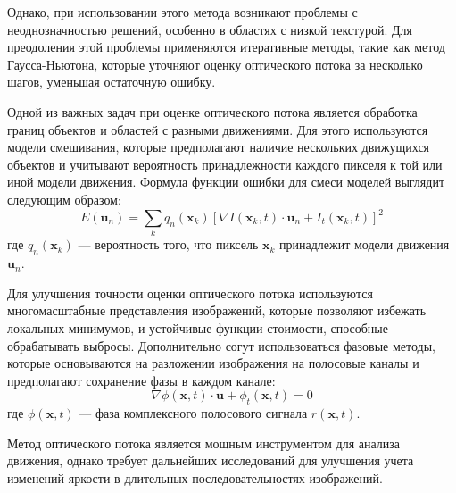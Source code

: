 Однако, при использовании этого метода возникают проблемы с неоднозначностью решений, особенно в областях с низкой текстурой. Для преодоления этой проблемы применяются итеративные методы, такие как метод Гаусса-Ньютона, которые уточняют оценку оптического потока за несколько шагов, уменьшая остаточную ошибку.

Одной из важных задач при оценке оптического потока является обработка границ объектов и областей с разными движениями. Для этого используются модели смешивания, которые предполагают наличие нескольких движущихся объектов и учитывают вероятность принадлежности каждого пикселя к той или иной модели движения. Формула функции ошибки для смеси моделей выглядит следующим образом:
\[ E(\mathbf{u}_n) = \sum_k q_n(\mathbf{x}_k) [\nabla I(\mathbf{x}_k, t) \cdot \mathbf{u}_n + I_t(\mathbf{x}_k, t)]^2 \]
где \( q_n(\mathbf{x}_k) \) — вероятность того, что пиксель \(\mathbf{x}_k\) принадлежит модели движения \(\mathbf{u}_n\).

Для улучшения точности оценки оптического потока используются многомасштабные представления изображений, которые позволяют избежать локальных минимумов, и устойчивые функции стоимости, способные обрабатывать выбросы. Дополнительно согут использоваться фазовые методы, которые основываются на разложении изображения на полосовые каналы и предполагают сохранение фазы в каждом канале:
\[ \nabla \phi(\mathbf{x}, t) \cdot \mathbf{u} + \phi_t(\mathbf{x}, t) = 0 \]
где \(\phi(\mathbf{x}, t)\) — фаза комплексного полосового сигнала \( r(\mathbf{x}, t) \).

Метод оптического потока является мощным инструментом для анализа движения, однако требует дальнейших исследований для улучшения учета изменений яркости в длительных последовательностях изображений.
